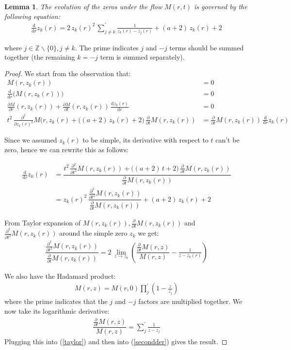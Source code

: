 \documentclass[a4paper,11pt,twoside]{amsart}
\newtheorem{lemma}[theorem]{Lemma}
\newcommand{\verifiedeq}{=}
\newcommand{\verifiedeq}{\stackrel{\checkmark}{=}}
\begin{document}
\begin{lemma}\label{proofBes2} The evolution of the zeros under the flow $M(r,t)$ is governed by the following equation:
\begin{align}
 \frac{\mathrm{d}}{\mathrm{d} r}z_k(r) \verifiedeq2\, z_k(r)^2\,\sum_{j \ne k}^{'} \frac{1}{z_k(r)-z_j(r)} +(a+2)\,z_k(r)+2
\end{align}
\end{lemma}
where $j \in \mathbb{Z}\backslash\{0\}, j \ne k$. The prime indicates $j$ and $-j$ terms should be summed together (the remaining $k=-j$ term is summed separately).
\begin{proof}
We start from the observation that:
\begin{align}
M(r,z_k(r)) &\verifiedeq 0 \\
\frac{\mathrm{d}}{\mathrm{d} r} \big(M(r,z_k(r))\big) &\verifiedeq 0 \\
\frac{\partial M}{\partial r}(r,z_k(r))+ \frac{\partial M}{\partial t}(r,z_k(r))\,\frac{\mathrm{d} z_k(r)}{\mathrm{d} r} &\verifiedeq 0 \\
t^2\,\frac{\partial^2}{\partial z_k(r)^2}M(r,z_k(r) + \big((a+2)\,z_k(r)+2\big)\,\frac{\partial }{\partial t}M(r,z_k(r))  &\verifiedeq \frac{\partial}{\partial t}M(r,z_k(r))\,\frac{\mathrm{d}}{\mathrm{d} r}z_k(r)
\end{align}

Since we assumed $z_k(r)$ to be simple, its derivative with respect to $t$ can't be zero, hence we can rewrite this as follows:

\begin{align}
\frac{\mathrm{d} }{\mathrm{d} r}z_k(r) &\verifiedeq \dfrac{t^2\,\frac{\partial^2}{\partial t^2}M(r,z_k(r)) + \big((a+2)\,t+2\big)\,\frac{\partial }{\partial t}M(r,z_k(r))}{ \frac{\partial}{\partial t}M(r,z_k(r))} \\
&\verifiedeq z_k(r)^2\,\dfrac{\frac{\partial^2}{\partial t^2}M(r,z_k(r))}{ \frac{\partial}{\partial t}M(r,z_k(r))}  + (a+2)\,z_k(r)+2 \label{secondder}
\end{align}

From Taylor expansion of $M(r,z_k(r)), \frac{\partial}{\partial t}M(r,z_k(r))$ and $\frac{\partial^2}{\partial t^2}M(r,z_k(r))$ around the simple zero $z_k$ we get:
\begin{align}\label{taylor}
 \dfrac{\frac{\partial^2}{\partial t^2}M(r,z_k(r))}{\frac{\partial}{\partial t}M(r,z_k(r))} \verifiedeq 2\,\lim_{z\to z_k} \left(\dfrac{\frac{\partial}{\partial t}M(r,z)}{M(r,z)} -\frac{1}{z - z_k(r)} \right)
\end{align}

We also have the Hadamard product: 
\begin{align}
  M(r,z) \verifiedeq M(r,0)\prod_j^{'}\left(1-\frac{z}{z_j}\right)
\end{align}
where the prime indicates that the $j$ and $-j$ factors are multiplied together. We now take its logarithmic derivative:
\begin{align}
  \dfrac{\frac{\partial}{\partial t}M(r,z)}{M(r,z)} \verifiedeq \sum_j^{'} \frac{1}{z-z_j}
\end{align}
Plugging this into (\ref{taylor}) and then into (\ref{secondder}) gives the result.
\end{proof}
\end{document}
